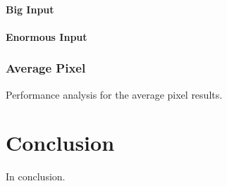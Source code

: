 \documentclass[12pt,a4paper]{article}
\newcommand{\sectionVspacing}{\vspace{15pt}}
\begin{document}
            \paragraph{Big Input}

            \paragraph{Enormous Input}




        \subsubsection{Average Pixel}
            Performance analysis for the average pixel results.

\sectionVspacing

\section{Conclusion}
In conclusion.
\end{document}
